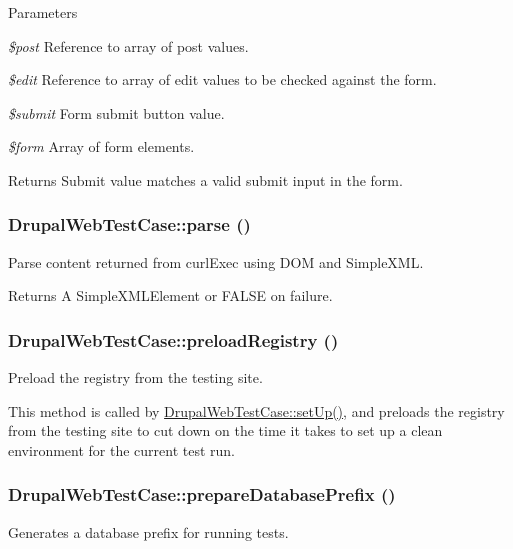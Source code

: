 \begin{DoxyParams}{Parameters}
\item[{\em \$post}]Reference to array of post values. \item[{\em \$edit}]Reference to array of edit values to be checked against the form. \item[{\em \$submit}]Form submit button value. \item[{\em \$form}]Array of form elements. \end{DoxyParams}
\begin{DoxyReturn}{Returns}
Submit value matches a valid submit input in the form. 
\end{DoxyReturn}
\hypertarget{classDrupalWebTestCase_a19289cdf27c85cad8e10960769d1e28b}{
\subsubsection[{parse}]{\setlength{\rightskip}{0pt plus 5cm}DrupalWebTestCase::parse ()}}
\label{classDrupalWebTestCase_a19289cdf27c85cad8e10960769d1e28b}
Parse content returned from curlExec using DOM and SimpleXML.

\begin{DoxyReturn}{Returns}
A SimpleXMLElement or FALSE on failure. 
\end{DoxyReturn}
\hypertarget{classDrupalWebTestCase_a72ead1d18fb2bd5e890c8a153e368fc8}{
\subsubsection[{preloadRegistry}]{\setlength{\rightskip}{0pt plus 5cm}DrupalWebTestCase::preloadRegistry ()}}
\label{classDrupalWebTestCase_a72ead1d18fb2bd5e890c8a153e368fc8}
Preload the registry from the testing site.

This method is called by \hyperlink{classDrupalWebTestCase_a110ecf5deb57ee6a908617360c1f6ec4}{DrupalWebTestCase::setUp()}, and preloads the registry from the testing site to cut down on the time it takes to set up a clean environment for the current test run. \hypertarget{classDrupalWebTestCase_ab0d1446330ac8178c8baefcd5cfa677c}{
\subsubsection[{prepareDatabasePrefix}]{\setlength{\rightskip}{0pt plus 5cm}DrupalWebTestCase::prepareDatabasePrefix ()}}
\label{classDrupalWebTestCase_ab0d1446330ac8178c8baefcd5cfa677c}
Generates a database prefix for running tests.

